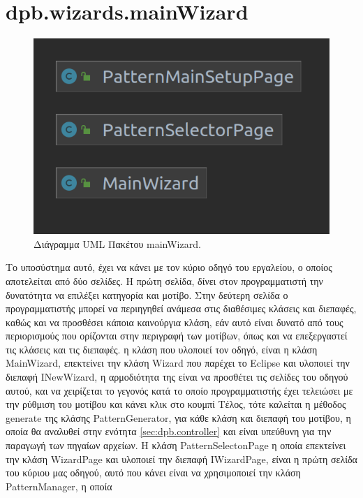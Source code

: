 \section{dpb.wizards.mainWizard}
\label{sec:dpb.wizards.mainWizard}
\begin{figure}[H]
    \centering
    \includegraphics[width=1.0\textwidth]{Figures/mainWizard.png}
    \caption{Διάγραμμα UML Πακέτου mainWizard.}
    \label{fig:mainWizardUML}
\end{figure}
Το υποσύστημα αυτό, έχει να κάνει με τον κύριο οδηγό του εργαλείου, ο οποίος αποτελείται από δύο σελίδες. Η πρώτη σελίδα, 
δίνει στον προγραμματιστή την δυνατότητα να επιλέξει κατηγορία και μοτίβο. Στην δεύτερη σελίδα ο προγραμματιστής μπορεί να περιηγηθεί 
ανάμεσα στις διαθέσιμες κλάσεις και διεπαφές, καθώς και να προσθέσει κάποια καινούργια κλάση, 
εάν αυτό είναι δυνατό από τους περιορισμούς που ορίζονται στην περιγραφή των μοτίβων, 
όπως και να επεξεργαστεί τις κλάσεις και τις διεπαφές. η κλάση που υλοποιεί τον οδηγό, είναι η κλάση MainWizard, επεκτείνει την κλάση Wizard που παρέχει 
το Eclipse και υλοποιεί την διεπαφή INewWizard, η αρμοδιότητα της είναι να προσθέτει τις σελίδες του οδηγού αυτού, και να χειρίζεται 
το γεγονός κατά το οποίο προγραμματιστής έχει τελειώσει με την ρύθμιση του μοτίβου και κάνει κλικ στο κουμπί Τέλος, τότε καλείται η μέθοδος generate της κλάσης PatternGenerator,
για κάθε κλάση και διεπαφή του μοτίβου, η οποία θα αναλυθεί στην ενότητα \ref{sec:dpb.controller} και είναι υπεύθυνη για την παραγωγή των πηγαίων αρχείων.
Η κλάση PatternSelectonPage η οποία επεκτείνει την κλάση WizardPage και υλοποιεί την διεπαφή IWizardPage, 
είναι η πρώτη σελίδα του κύριου μας οδηγού, αυτό που κάνει είναι να χρησιμοποιεί την κλάση PatternManager, η οποία 
